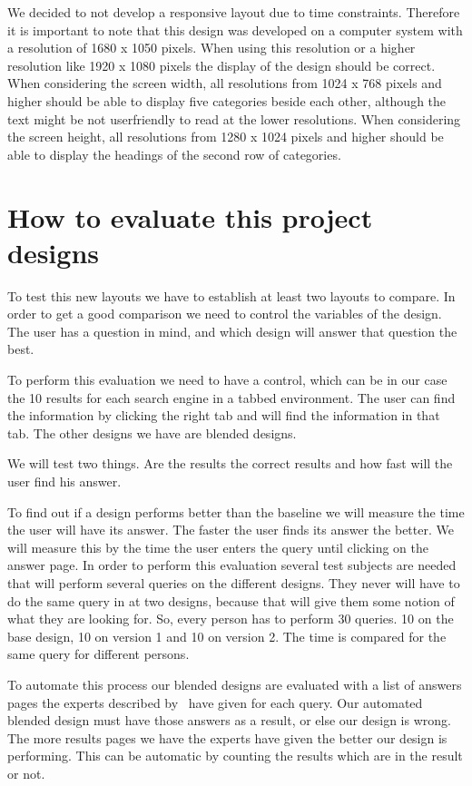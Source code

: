 \documentclass[12pt]{article}
\begin{document}
We decided to not develop a responsive layout due to time constraints.
Therefore it is important to note that this design was developed on a computer system with a resolution of 1680 x 1050 pixels.
When using this resolution or a higher resolution like 1920 x 1080 pixels the display of the design should be correct.
When considering the screen width, all resolutions from 1024 x 768 pixels and higher should be able to display five categories beside each other, although the text might be not userfriendly to read at the lower resolutions.
When considering the screen height, all resolutions from 1280 x 1024 pixels and higher should be able to display the headings of the second row of categories.

\section{How to evaluate this project designs}
\label{sec:evaluation}
To test this new layouts we have to establish at least two layouts to compare. In order to get a good comparison we need to control the variables of the design. The user has a question in mind, and which design will answer that question the best. 

To perform this evaluation we need to have a control, which can be in our case the 10 results for each search engine in a tabbed environment. The user can find the information by clicking the right tab and will find the information in that tab. The other designs we have are blended designs.

We will test two things. Are the results the correct results and how fast will the user find his answer. 

To find out if a design performs better than the baseline we will measure the time the user will have its answer. The faster the user finds its answer the better. We will measure this by the time the user enters the query until clicking on the answer page. In order to perform this evaluation several test subjects are needed that will perform several queries on the different designs. They never will have to do the same query in at two designs, because that will give them some notion of what they are looking for. So, every person has to perform 30 queries. 10 on the base design, 10 on version 1 and 10 on version 2. The time is compared for the same query for different persons.

To automate this process our blended designs are evaluated with a list of answers pages the experts described by~\cite{lalmas2011aggregated} have given for each query. Our automated blended design must have those answers as a result, or else our design is wrong. The more results pages we have the experts have given the better our design is performing. This can be automatic by counting the results which are in the result or not. 
\end{document}
